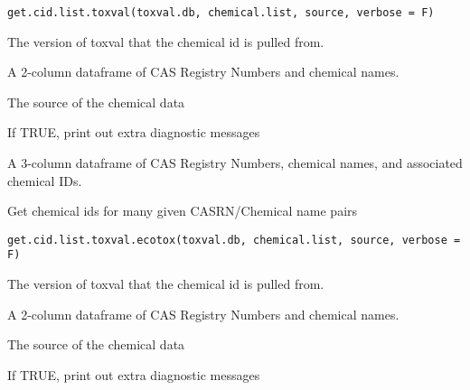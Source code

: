 \documentclass[letterpaper]{book}
\begin{document}
%
\begin{Usage}
\begin{verbatim}
get.cid.list.toxval(toxval.db, chemical.list, source, verbose = F)
\end{verbatim}
\end{Usage}
%
\begin{Arguments}
\begin{ldescription}
\item[\code{toxval.db}] The version of toxval that the chemical id is pulled from.

\item[\code{chemical.list}] A 2-column dataframe of CAS Registry Numbers and chemical names.

\item[\code{source}] The source of the chemical data

\item[\code{verbose}] If TRUE, print out extra diagnostic messages
\end{ldescription}
\end{Arguments}
%
\begin{Value}
A 3-column dataframe of CAS Registry Numbers, chemical names, and associated chemical IDs.
\end{Value}
%
\begin{Description}\relax
Get chemical ids for many given CASRN/Chemical name pairs
\end{Description}
%
\begin{Usage}
\begin{verbatim}
get.cid.list.toxval.ecotox(toxval.db, chemical.list, source, verbose = F)
\end{verbatim}
\end{Usage}
%
\begin{Arguments}
\begin{ldescription}
\item[\code{toxval.db}] The version of toxval that the chemical id is pulled from.

\item[\code{chemical.list}] A 2-column dataframe of CAS Registry Numbers and chemical names.

\item[\code{source}] The source of the chemical data

\item[\code{verbose}] If TRUE, print out extra diagnostic messages
\end{ldescription}
\end{Arguments}
\end{document}
